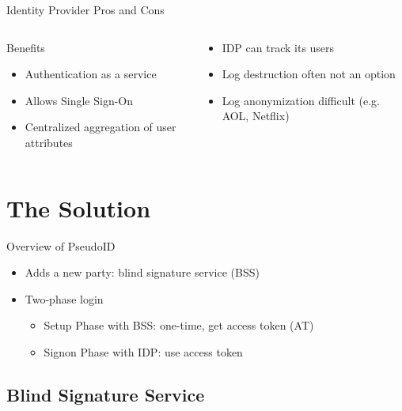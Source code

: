 \documentclass[handout]{beamer}
\begin{document}
\begin{frame}{Identity Provider Pros and Cons}
  \begin{columns}[t]
    \begin{column}{5cm}
      {\LARGE{Benefits}}
        \begin{itemize}
          \item<1-> Authentication as a service
          \item<2-> Allows Single Sign-On
          \item<3-> Centralized aggregation of user attributes
        \end{itemize}
    \end{column}
    \begin{column}{5cm}
        \begin{itemize}
          \item<4-> IDP can track its users
          \item<5-> Log destruction often not an option
          \item<6-> Log anonymization difficult (e.g. AOL, Netflix)
        \end{itemize}
    \end{column}
  \end{columns}
\end{frame}

\section{The Solution}

\begin{frame}{Overview of PseudoID}
  \begin{itemize}
    \item Adds a new party: blind signature service (BSS)
    \item Two-phase login
      \begin{itemize}
        \item Setup Phase with BSS: one-time, get access token (AT)
        \item Signon Phase with IDP: use access token
      \end{itemize}
  \end{itemize}
\end{frame}

\subsection{Blind Signature Service}
\end{document}
